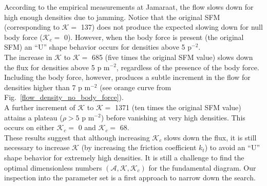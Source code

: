 \documentclass[preprint,12pt]{elsarticle}
\begin{document}
According to the empirical measurements at Jamaraat, the flow slows down for
high enough densities due to jamming. Notice that the original SFM
(corresponding to $\mathcal{K}=$ 137) does not produce the expected slowing down
for null body force ($\mathcal{K}_c=$ 0). However, when the body force is
present (the original SFM) an ``U'' shape behavior occurs for densities above 5
p$^{-2}$.\\

The increase in $\mathcal{K}$ to $\mathcal{K} = $ 685 (five times the original
SFM value) slows down  the flux for densities above 5 p m$^{-2}$, regardless of
the presence of the body force. Including the body force, however, produces a
subtle increment in the flow for densities higher than 7 p m$^{-2}$ (see orange
curve from Fig.~\ref{flow_density_no_body_force}). \\

A further increment of $\mathcal{K}$ to $\mathcal{K}=$ 1371 (ten times the 
original SFM value) attains a plateau ($\rho>5$ p m$^{-2}$) before vanishing at 
very high densities. This occurs on either $\mathcal{K}_c=$ 0 and 
$\mathcal{K}_c = $ 68.\\


These results suggest that although increasing $\mathcal{K}_c$ slows down the
flux, it is still necessary to increase $\mathcal{K}$ (by increasing the
friction coefficient $k_t$) to avoid an ``U'' shape behavior for extremely high
densities. It is still a challenge to find the optimal dimensionless numbers
$(\mathcal{A},\mathcal{K},\mathcal{K}_c)$ for the fundamental diagram. Our
inspection into the parameter set is a first approach to narrow down the
search.\\
\end{document}
